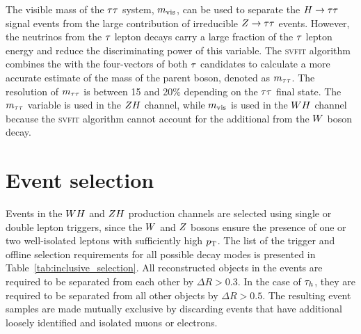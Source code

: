 The visible mass of the $\tau\tau$ system, $m_\text{vis}$, can be used to separate
the $H\to \tau \tau$ signal events
from the large contribution of irreducible $Z \to \tau \tau$ events.
However, the neutrinos from the $\tau$ lepton decays carry a large fraction of
the $\tau$ lepton energy and reduce the discriminating power of this variable.
The \textsc{svfit} algorithm~\cite{Bianchini:2014vza} combines the \etvecmiss 
with the four-vectors of both $\tau$ candidates to calculate a more accurate 
estimate of the mass of the parent boson, denoted as $m_{\tau\tau}$. The resolution 
of $m_{\tau\tau}$ is between 15 and 20\% depending on the $\tau\tau$ final state. The 
$m_{\tau\tau}$ variable is used in the $ZH$ channel, while $m_\text{vis}$ is used in the 
$WH$ channel because the \textsc{svfit} algorithm cannot account for the 
additional \etvecmiss from the $W$ boson decay. 



\section{Event selection}
\label{sec:selection}

Events in the $WH$ and $ZH$ production channels are selected using single or 
double lepton triggers, since the $W$ and $Z$ bosons ensure the presence of one or two well-isolated leptons with sufficiently 
high $p_\mathrm{T}$. The list of the trigger and offline selection requirements for 
all possible decay modes is presented in Table~\ref{tab:inclusive_selection}.
All reconstructed objects in the events are required to be separated from each 
other by $\Delta R > 0.3$. In the case of $\tau_{h}$, they are required to be 
separated from all other objects by $\Delta R > 0.5$. The resulting event samples are made mutually 
exclusive by discarding events that have additional loosely identified 
and isolated muons or electrons.

